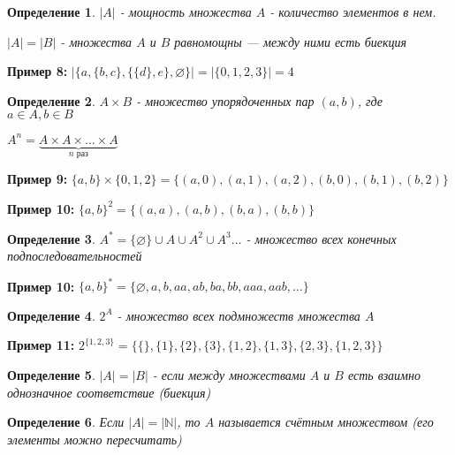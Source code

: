 \documentclass{article}
\newtheorem{definition}{Определение}
\begin{document}
\begin{definition}
 	$|A|$ - мощность множества $A$ - количество элементов в нем.
 	
 	$|A| = |B|$ - множества $A$ и $B$ равномощны --- между ними есть биекция 
\end{definition}


\textbf{Пример 8:} $|\{a,\{b,c\},\{\{d\},e\},\varnothing\}| = |\{0,1,2,3\}| = 4$

\begin{definition}
	$A \times B$ - множество упорядоченных пар $(a,b)$, где $a\in A, b\in B$
	
	$A^n = \underbrace{A\times A \times \dotsc \times A}_{n \text{ раз}}$
\end{definition}

\textbf{Пример 9:} $\{a,b\}\times \{0,1,2\} = \{(a,0),(a,1),(a,2),(b,0),(b,1),(b,2)\} $

\textbf{Пример 10:} $\{a,b\}^2 = \{(a,a),(a,b),(b,a),(b,b)\} $

\begin{definition}
	$A^* = \{\varnothing\} \cup A \cup A^2 \cup A^3 \dotsc$ - множество всех конечных подпоследовательностей
\end{definition}

\textbf{Пример 10:} $\{a,b\}^* = \{\varnothing, a,b,aa,ab,ba,bb,aaa,aab,\dotsc\} $

\begin{definition}
	$2^A$ - множество всех подмножеств множества $A$
\end{definition}

\textbf{Пример 11:} $2^{\{1,2,3\}} = \{\{\}, \{1\},\{2\},\{3\},\{1,2\},\{1,3\},\{2,3\},\{1,2,3\}\} $

\begin{definition}
	$|A| = |B|$ - если между множествами $A$ и $B$ есть взаимно однозначное соответствие (биекция)
\end{definition}

\begin{definition}
	Если $|A| = |\mathbb{N}|$, то $A$ называется счётным множеством (его элементы можно пересчитать)
\end{definition}
\end{document}
